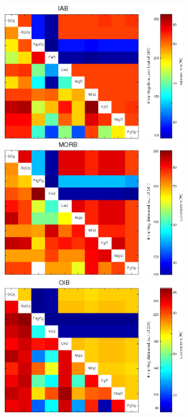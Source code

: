 \begin{figure}[htbp]
  \centering
  \includegraphics[width=300]{figures/xPlotMajor3Ti_linear_IAB.jpg}
  \includegraphics[width=300]{figures/xPlotMajor3Ti_linear_MORB.jpg}\\
  \includegraphics[width=300]{figures/xPlotMajor3Ti_linear_OIB.jpg}

\end{figure}
